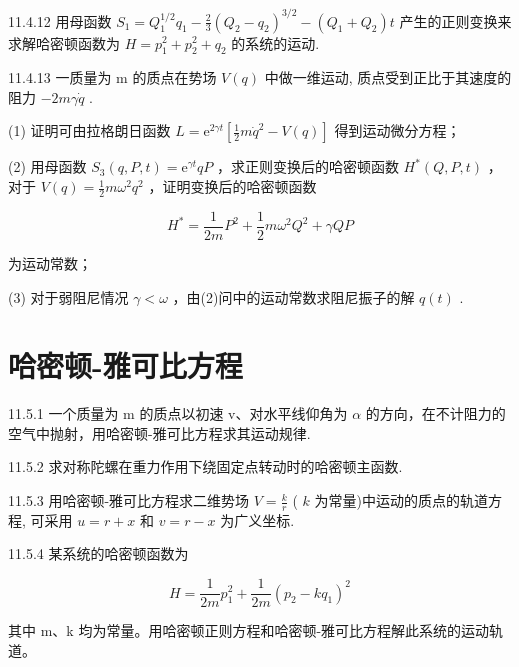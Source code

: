 \begin{problem}{11.4.12}
用母函数 $S_{1} = Q_{1}^{1 / 2}q_{1} - \frac{2}{3} (Q_{2} - q_{2})^{3 / 2} - (Q_{1} + Q_{2})t$ 产生的正则变换来求解哈密顿函数为 $H = p_1^2 +p_2^2 +q_2$ 的系统的运动.
\end{problem}
\clearpage


\begin{problem}{11.4.13}
一质量为 m 的质点在势场 $V(q)$ 中做一维运动, 质点受到正比于其速度的阻力 $-2m\gamma\dot{q}$ .

(1) 证明可由拉格朗日函数 $L = \mathrm{e}^{2\gamma t}\left[\frac{1}{2} m\dot{q}^2 - V(q)\right]$ 得到运动微分方程；

(2) 用母函数 $S_{3}(q, P, t) = \mathrm{e}^{\gamma t} q P$ ，求正则变换后的哈密顿函数 $H^{*}(Q, P, t)$ ，对于 $V(q) = \frac{1}{2} m \omega^{2} q^{2}$ ，证明变换后的哈密顿函数

\[
H ^ {*} = \frac {1}{2 m} P ^ {2} + \frac {1}{2} m \omega^ {2} Q ^ {2} + \gamma Q P
\]

为运动常数；

(3) 对于弱阻尼情况 $\gamma < \omega$ ，由(2)问中的运动常数求阻尼振子的解 $q(t)$ .
\end{problem}
\clearpage


\section{哈密顿-雅可比方程}

\begin{problem}{11.5.1}
一个质量为 m 的质点以初速 v、对水平线仰角为 $\alpha$ 的方向，在不计阻力的空气中抛射，用哈密顿-雅可比方程求其运动规律.
\end{problem}
\clearpage


\begin{problem}{11.5.2}
求对称陀螺在重力作用下绕固定点转动时的哈密顿主函数.
\end{problem}
\clearpage


\begin{problem}{11.5.3}
用哈密顿-雅可比方程求二维势场 $V = \frac{k}{r}$ ( $k$ 为常量)中运动的质点的轨道方程, 可采用 $u = r + x$ 和 $v = r - x$ 为广义坐标.
\end{problem}
\clearpage


\begin{problem}{11.5.4}
某系统的哈密顿函数为

\[
H = \frac {1}{2 m} p _ {1} ^ {2} + \frac {1}{2 m} (p _ {2} - k q _ {1}) ^ {2}
\]

其中 m、k 均为常量。用哈密顿正则方程和哈密顿-雅可比方程解此系统的运动轨道。
\end{problem}
\clearpage


